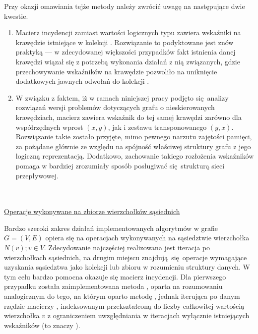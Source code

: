 {{      Przy okazji omawiania tejże metody należy zwrócić uwagę na następujące dwie kwestie.
      \begin{enumerate}
        \item Macierz incydencji  zamiast wartości logicznych typu  zawiera wskaźniki na krawędzie istniejące w kolekcji .
        Rozwiązanie to podyktowane jest znów praktyką --- w zdecydowanej większości przypadków fakt istnienia danej krawędzi wiązał się z potrzebą wykonania działań z nią związanych, gdzie przechowywanie wskaźników na krawędzie pozwoliło na uniknięcie dodatkowych jawnych odwołań do kolekcji .
        \item W związku z faktem, iż w ramach niniejszej pracy podjęto się analizy rozwiązań wersji problemów dotyczących grafu o nieskierowanych krawędziach, macierz  zawiera wskaźnik do tej samej krawędzi zarówno dla współrzędnych wprost $(x, y)$, jak i zestawu transponowanego $(y, x)$.
        Rozwiązanie takie zostało przyjęte, mimo pewnego narzutu zajętości pamięci, za pożądane głównie ze względu na spójność właściwej struktury grafu z jego logiczną reprezentacją.
        Dodatkowo, zachowanie takiego rozłożenia wskaźników pomaga w bardziej zrozumiały sposób posługiwać się strukturą sieci przepływowej.
      \end{enumerate}
  }
  \\\\\underline{Operacje wykonywane na zbiorze wierzchołków sąsiednich}\\
  \par{
    Bardzo szeroki zakres działań implementowanych algorytmów w grafie $G=(V,E)$ opiera się na operacjach wykonywanych na sąsiedztwie wierzchołka $N(v); v \in V$.
    Zdecydowanie najczęściej realizowana jest iteracja po wierzchołkach sąsiednich, na drugim miejscu znajdują się operacje wymagające uzyskania sąsiedztwa jako kolekcji lub zbioru w rozumieniu struktury danych.
    W tym celu bardzo pomocna okazuje się macierz incydencji.
    Dla pierwszego przypadku została zaimplementowana metoda , oparta na rozumowaniu analogicznym do tego, na którym oparto metodę , jednak iterująca po danym rzędzie macierzy , indeksowanym przekształconą do liczby całkowitej wartością wierzchołka $v$ z ograniczeniem uwzględniania w iteracjach wyłącznie istniejących wskaźników (to znaczy ).

}}
